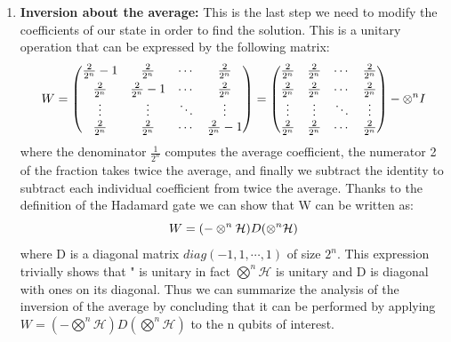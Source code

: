 \documentclass[english]{article}
\begin{document}
\begin{enumerate}
					\item \textbf{Inversion about the average:}
					This is the last step we need to modify the coefficients of our state in order to find the solution. This is a unitary operation that can be expressed by the following matrix:
					\begin{equation*}
						\centering
						W =
						\begin{pmatrix}
						\frac{2}{2^n}-1 & \frac{2}{2^n} & \cdots & \frac{2}{2^n} \vspace{3pt} \\
						\frac{2}{2^n} & \frac{2}{2^n}-1 & \cdots & \frac{2}{2^n} \\
						\vdots & \vdots & \ddots & \vdots \\
						\frac{2}{2^n} & \frac{2}{2^n} & \cdots & \frac{2}{2^n}-1
						\end{pmatrix}
						=
						\begin{pmatrix}
						\frac{2}{2^n} & \frac{2}{2^n} & \cdots & \frac{2}{2^n} \vspace{3pt} \\
						\frac{2}{2^n} & \frac{2}{2^n} & \cdots & \frac{2}{2^n} \\
						\vdots & \vdots & \ddots & \vdots \\
						\frac{2}{2^n} & \frac{2}{2^n} & \cdots & \frac{2}{2^n}
						\end{pmatrix}
						- \otimes^{n}I
					\end{equation*}
					where the denominator $\frac{1}{2^n}$ computes the average coefficient, the numerator 2 of the fraction takes twice the average, and finally we subtract the identity to subtract each individual coefficient from twice the average. Thanks to the definition of the Hadamard gate we can show that W can be written as:
					\begin{equation*}
					\centering
					W = (-\otimes^n\mathcal{H})D(\otimes^n\mathcal{H})
					\end{equation*}
					where D is a diagonal matrix $diag(-1,1,\cdots,1)$ of size $2^n$. This expression trivially shows that " is unitary in fact $\bigotimes^n\mathcal{H}$ is unitary and D is diagonal with ones on its diagonal. Thus we can summarize the analysis of the inversion of the average by concluding that it can be performed by applying $W = (-\bigotimes^n\mathcal{H})D(\bigotimes^n\mathcal{H})$ to the n qubits of interest.
				\end{enumerate} 
\end{document}
